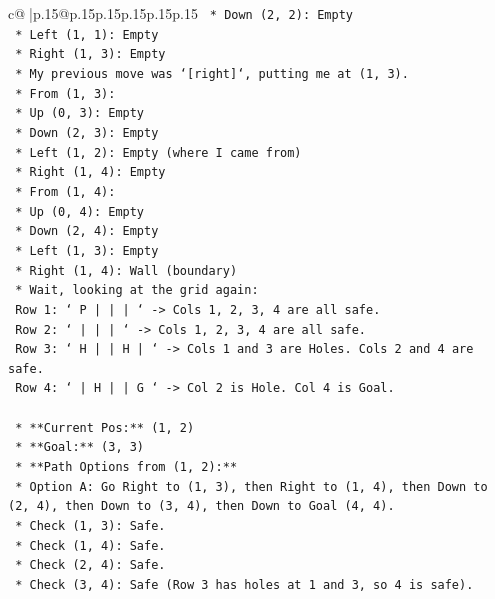 \documentclass{article}
\begin{document}
{\begin{supertabular}{c@{$\;$}|p{.15\linewidth}@{}p{.15\linewidth}p{.15\linewidth}p{.15\linewidth}p{.15\linewidth}p{.15\linewidth}}
{{{\texttt{        *   Down (2, 2): Empty} \\
\texttt{        *   Left (1, 1): Empty} \\
\texttt{        *   Right (1, 3): Empty} \\
\texttt{    *   My previous move was `{[}right{]}`, putting me at (1, 3).} \\
\texttt{    *   From (1, 3):} \\
\texttt{        *   Up (0, 3): Empty} \\
\texttt{        *   Down (2, 3): Empty} \\
\texttt{        *   Left (1, 2): Empty (where I came from)} \\
\texttt{        *   Right (1, 4): Empty} \\
\texttt{    *   From (1, 4):} \\
\texttt{        *   Up (0, 4): Empty} \\
\texttt{        *   Down (2, 4): Empty} \\
\texttt{        *   Left (1, 3): Empty} \\
\texttt{        *   Right (1, 4): Wall (boundary)} \\
\texttt{    *   Wait, looking at the grid again:} \\
\texttt{        Row 1: `  P  |     |     |     ` {-}> Cols 1, 2, 3, 4 are all safe.} \\
\texttt{        Row 2: `     |     |     |     ` {-}> Cols 1, 2, 3, 4 are all safe.} \\
\texttt{        Row 3: `  H  |     |  H  |     ` {-}> Cols 1 and 3 are Holes. Cols 2 and 4 are safe.} \\
\texttt{        Row 4: `     |  H  |     |  G  ` {-}> Col 2 is Hole. Col 4 is Goal.} \\
\\ 
\texttt{    *   **Current Pos:** (1, 2)} \\
\texttt{    *   **Goal:** (3, 3)} \\
\texttt{    *   **Path Options from (1, 2):**} \\
\texttt{        *   Option A: Go Right to (1, 3), then Right to (1, 4), then Down to (2, 4), then Down to (3, 4), then Down to Goal (4, 4).} \\
\texttt{            *   Check (1, 3): Safe.} \\
\texttt{            *   Check (1, 4): Safe.} \\
\texttt{            *   Check (2, 4): Safe.} \\
\texttt{            *   Check (3, 4): Safe (Row 3 has holes at 1 and 3, so 4 is safe).} \\
}}}
\end{supertabular}}
\end{document}
